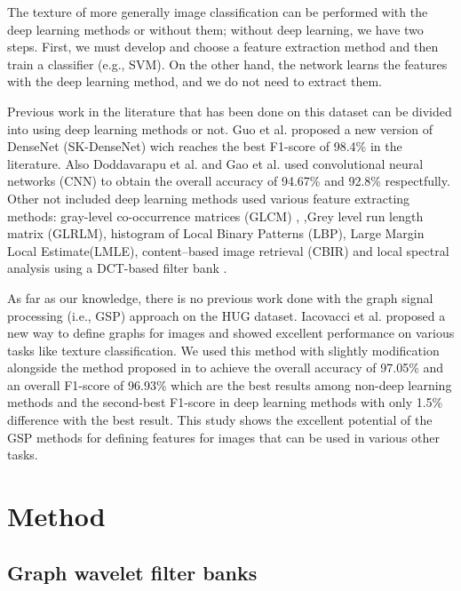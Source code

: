 \documentclass[conference]{IEEEtran}
\begin{document}
The texture of more generally image classification can be performed with the deep learning methods or without them; without deep learning, we have two steps. First, we must develop and choose a feature extraction method and then train a classifier (e.g., SVM). On the other hand, the network learns the features with the deep learning method, and we do not need to extract them. 


Previous work in the literature that has been done on this dataset can be divided into using deep learning methods or not.
Guo et al. \cite{Fscore984} proposed a new version of DenseNet (SK-DenseNet) wich reaches the best F1-score of 98.4\% in the literature. Also Doddavarapu et al. \cite{acc9467} and Gao et al.\cite{acc928} used convolutional neural networks (CNN) to obtain the overall accuracy of 94.67\% and 92.8\% respectfully. Other not included deep learning methods used various feature extracting methods: gray-level co-occurrence matrices (GLCM) \cite{acc934},\cite{GLCM2} ,Grey level run length matrix (GLRLM)\cite{acc934}, histogram of Local Binary Patterns (LBP)\cite{acc934}, Large Margin Local Estimate(LMLE)\cite{acc861}, content–based image retrieval (CBIR) \cite{acc86} and local spectral analysis using a DCT-based filter bank \cite{Fscore89}.


As far as our knowledge, there is no previous work done with the graph signal processing (i.e., GSP) approach on the HUG dataset. Iacovacci et al. \cite{IVG} proposed a new way to define graphs for images and showed excellent performance on various tasks like texture classification. We used this method with slightly modification alongside the method proposed in \cite{wavelet} to achieve the overall accuracy of 97.05\% and an overall F1-score of 96.93\% which are the best results among non-deep learning methods and the second-best F1-score in deep learning methods with only 1.5\% difference with the best result. This study shows the excellent potential of the GSP methods for defining features for images that can be used in various other tasks.


\section{\large{Method}}
\subsection{\textbf{Graph wavelet filter banks}}
\end{document}
